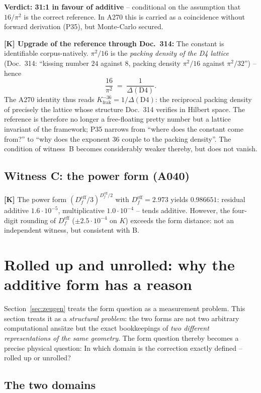 \textbf{Verdict: 31:1 in favour of additive} -- conditional on the
assumption that $16/\pi^2$ is the correct reference. In A270 this is
carried as a coincidence without forward derivation (P35), but
Monte-Carlo secured.

\textbf{[K] Upgrade of the reference through Doc.~314:} The constant is
identifiable corpus-natively. $\pi^2/16$ is the \emph{packing density
of the D4 lattice} (Doc.~314: \enquote{kissing number $24$ against
$8$, packing density $\pi^2/16$ against $\pi^2/32$}) -- hence
\[
  \frac{16}{\pi^2} \;=\; \frac{1}{\Delta(\mathrm{D4})}.
\]
The A270 identity thus reads
$K_\text{frak}^{-36} = 1/\Delta(\mathrm{D4})$: the reciprocal packing
density of precisely the lattice whose structure Doc.~314 verifies in
Hilbert space. The reference is therefore no longer a free-floating
pretty number but a lattice invariant of the framework; P35 narrows
from \enquote{where does the constant come from?} to \enquote{why does
the exponent $36$ couple to the packing density}. The condition of
witness~B becomes considerably weaker thereby, but does not vanish.

\subsection{Witness C: the power form (A040)}

\textbf{[K]} The power form $(D_f^\text{eff}/3)^{D_f^\text{eff}/2}$
with $D_f^\text{eff} = 2.973$ yields $0.986651$: residual additive
$1.6\cdot10^{-5}$, multiplicative $1.0\cdot10^{-4}$ -- tends additive.
However, the four-digit rounding of $D_f^\text{eff}$
($\pm2.5\cdot10^{-4}$ on $K$) exceeds the form distance: not an
independent witness, but consistent with B.



\section{Rolled up and unrolled: why the additive form has a reason}
\label{sec:eingerollt}

Section~\ref{sec:zeugen} treats the form question as
a measurement problem. This section treats it as a \emph{structural
problem}: the two forms are not two arbitrary computational ans\"atze
but the exact bookkeepings of \emph{two different representations of
the same geometry}. The form question thereby becomes a precise
physical question: In which domain is the correction exactly defined
-- rolled up or unrolled?

\subsection{The two domains}

